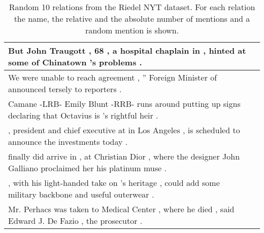 \begin{table}



\caption{Random 10 relations from the Riedel NYT dataset. For each relation the name, the relative and the absolute number of mentions and a random mention is shown.}

\label{table03:nyt}

\begin{tabular}{p{} P{1,4cm} }
\hline
\hline
{} {But John Traugott , 68 , a hospital chaplain in \underline{} , \underline{} hinted at some of Chinatown 's problems .} &    \\ 
\hline
{} {We were unable to reach agreement , '' Foreign Minister \underline{} of \underline{} announced tersely to reporters .} &    \\ 
\hline
{} {Camane -LRB- Emily Blunt -RRB- runs around \underline{} putting up signs declaring that Octavius is \underline{} 's rightful heir .} &    \\ 
\hline
{} {\underline{} , president and chief executive at \underline{} in Los Angeles , is scheduled to announce the investments today .} &    \\ 
\hline
{} {\underline{} finally did arrive in \underline{} , at Christian Dior , where the designer John Galliano proclaimed her his platinum muse .} &    \\ 
\hline
{} {\underline{} , with his light-handed take on \underline{} 's heritage , could add some military backbone and useful outerwear .} &    \\ 
\hline
{} {Mr. Perhacs was taken to \underline{} Medical Center , where he died , said Edward J. De Fazio , the \underline{} prosecutor .} &    \\ 

\end{tabular}
\end{table}
